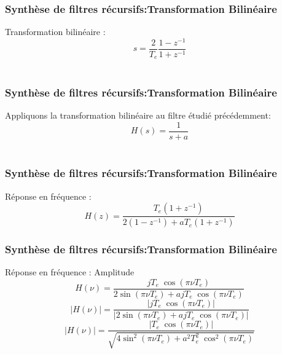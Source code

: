 \documentclass{beamer}
\begin{document}
\begin{frame}
\frametitle{Synthèse de filtres récursifs:Transformation Bilinéaire} 
Transformation bilinéaire : 
\[ s = \frac{2}{T_e} \frac{1-z^{-1}}{1+z^{-1}} \] \\
\vspace{0.2cm}
\end{frame}

\begin{frame}
\frametitle{Synthèse de filtres récursifs:Transformation Bilinéaire}
Appliquons la transformation bilinéaire au filtre étudié précédemment:
\[ H(s) = \frac{1}{s+a} \]\\
\vspace{0.2cm}
\vspace{0.2cm}
\end{frame}

\begin{frame}
\frametitle{Synthèse de filtres récursifs:Transformation Bilinéaire}
Réponse en fréquence :
\vspace{0.2cm}
\[ H(z)  =\frac{T_e(1+z^{-1})}{2(1-z^{-1}) + aT_e(1+z^{-1})}\]
 \vspace{0.2cm}
\end{frame}


\begin{frame}
\frametitle{Synthèse de filtres récursifs:Transformation Bilinéaire}
Réponse en fréquence :  Amplitude
\vspace{0.2cm}
\[H(\nu) =  \frac{jT_e\; \cos(\pi \nu T_e)}{2\sin(\pi \nu T_e)+ ajT_e\; \cos(\pi \nu T_e)}\]
\vspace{0.2cm}
\[|H(\nu)| =  \frac{|jT_e\; \cos(\pi \nu T_e)|}{|2\sin(\pi \nu T_e)+ ajT_e\; \cos(\pi \nu T_e)|}\]
\vspace{0.2cm}
\[|H(\nu)| =  \frac{|T_e\; \cos(\pi \nu T_e)|}{\sqrt{4\sin^2(\pi \nu T_e)+ a^2T_e^2\; \cos^2(\pi \nu T_e)}}\]

\end{frame}
\end{document}
